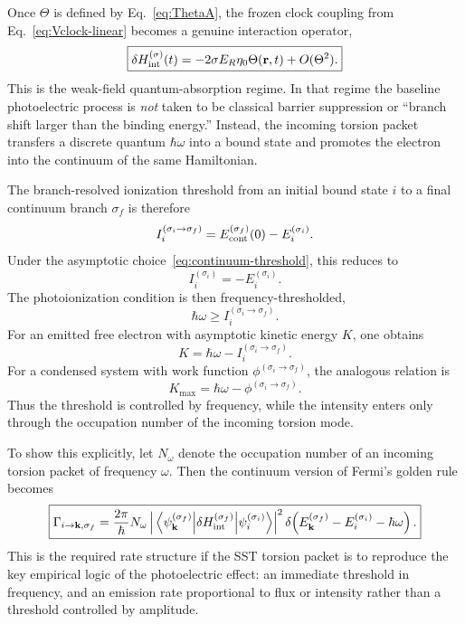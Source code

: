 \documentclass[11pt,a4paper]{article}
\begin{document}
Once $\Theta$ is defined by Eq.~\eqref{eq:ThetaA}, the frozen clock coupling from Eq.~\eqref{eq:Vclock-linear} becomes a genuine interaction operator,
\begin{equation}
\label{eq:HintTheta}
\boxed{
\delta H_{\rm int}^{(\sigma)}(t)
=
-2\sigma E_R\eta_0\Theta(\mathbf r,t)
+O(\Theta^2).
}
\end{equation}
This is the weak-field quantum-absorption regime. In that regime the baseline photoelectric process is \emph{not} taken to be classical barrier suppression or ``branch shift larger than the binding energy.'' Instead, the incoming torsion packet transfers a discrete quantum $\hbar\omega$ into a bound state and promotes the electron into the continuum of the same Hamiltonian.

The branch-resolved ionization threshold from an initial bound state $i$ to a final continuum branch $\sigma_f$ is therefore
\begin{equation}
\label{eq:IonizationThresholdGeneral}
I_i^{(\sigma_i\to \sigma_f)}
=
E_{\rm cont}^{(\sigma_f)}(0)-E_i^{(\sigma_i)}.
\end{equation}
Under the asymptotic choice~\eqref{eq:continuum-threshold}, this reduces to
\begin{equation}
\label{eq:IonizationThresholdSimple}
I_i^{(\sigma_i)}=-E_i^{(\sigma_i)}.
\end{equation}
The photoionization condition is then frequency-thresholded,
\begin{equation}
\label{eq:PhotoThreshold}
\boxed{
\hbar\omega \ge I_i^{(\sigma_i\to \sigma_f)}.
}
\end{equation}
For an emitted free electron with asymptotic kinetic energy $K$, one obtains
\begin{equation}
\label{eq:KineticEnergyAtom}
\boxed{
K
=
\hbar\omega - I_i^{(\sigma_i\to \sigma_f)}.
}
\end{equation}
For a condensed system with work function $\phi^{(\sigma_i\to \sigma_f)}$, the analogous relation is
\begin{equation}
\label{eq:PhotoelectricSolid}
\boxed{
K_{\max}
=
\hbar\omega - \phi^{(\sigma_i\to \sigma_f)}.
}
\end{equation}
Thus the threshold is controlled by frequency, while the intensity enters only through the occupation number of the incoming torsion mode.

To show this explicitly, let $N_\omega$ denote the occupation number of an incoming torsion packet of frequency $\omega$. Then the continuum version of Fermi's golden rule becomes
\begin{equation}
\label{eq:GoldenRuleContinuum}
\boxed{
\Gamma_{i\to \mathbf k,\sigma_f}
=
\frac{2\pi}{\hbar}
N_\omega
\left|
\matrixel{\psi_{\mathbf k}^{(\sigma_f)}}{\delta H_{\rm int}^{(\sigma_f)}}{\psi_i^{(\sigma_i)}}
\right|^2
\delta\!\left(
E_{\mathbf k}^{(\sigma_f)}-E_i^{(\sigma_i)}-\hbar\omega
\right).
}
\end{equation}
This is the required rate structure if the SST torsion packet is to reproduce the key empirical logic of the photoelectric effect: an immediate threshold in frequency, and an emission rate proportional to flux or intensity rather than a threshold controlled by amplitude.
\end{document}
